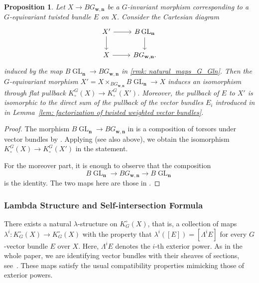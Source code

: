 \documentclass[12pt]{amsart}
\newcommand{\GL}{\operatorname{GL}}
\newcommand{\Kring}{K^{\circ}}
\newcommand{\Kgroup}{K_{\circ}}
\newtheorem{Prop}[theorem]{Proposition}
\theoremstyle{definition}
\begin{document}
\begin{Prop}\label{lemma: BT-toBGwn}
Let $X \to BG_{\mathbf{w},\mathbf{n}}$ be a $G$-invariant morphism corresponding to a $G$-equivariant twisted bundle $E$ on $X$. Consider the Cartesian diagram
\[
\begin{tikzcd}
X' \arrow[r] \arrow[d] & B \GL_{\mathbf{n}} \arrow[d] \\
X \arrow[r] & B G_{\mathbf{w},\mathbf{n}}.
\end{tikzcd}
\]
induced by the map $ B \GL_{\mathbf{n}} \longrightarrow BG_{\mathbf{w},\mathbf{n}}$ in \ref{rmk: natural_maps_G_Gln}. Then the $G$-equivariant morphism $X' = X \times_{BG_{\mathbf{w},\mathbf{n}}} B\GL_{\mathbf{n}} \longrightarrow X$ induces an isomorphism through flat pullback $\Kgroup^G(X) \rightarrow \Kgroup^G(X')$.
Moreover, the pullback of $E$ to $X'$ is isomorphic to the direct sum of the pullback of the vector bundles $E_i$ introduced in in Lemma~\ref{lem: factorization of twisted weighted vector bundles}.
\end{Prop}

\begin{proof}
    The morphism $ B \GL_{\mathbf{n}} \longrightarrow BG_{\mathbf{w},\mathbf{n}}$ in  is a composition of torsors under vector bundles by . Applying \cite[Theorem 4.1]{Thomason-equivariantKtheory} (see also  above), we obtain the isomorphism $\Kgroup^G(X) \rightarrow \Kgroup^G(X')$ in the statement.

     For the moreover part, it is enough to observe that the composition 
     $$  B \GL_{\mathbf{n}} \longrightarrow B G_{\mathbf{w},\mathbf{n}}\longrightarrow B \GL_{\mathbf{n}} $$ 
     is the identity. The two maps here are those in .
\end{proof}

\subsubsection{Lambda Structure and Self-intersection Formula}

There exists a natural $\lambda$-structure on $\Kring_G(X)$, that is, a collection of maps $\lambda^i:\Kring_G(X)\rightarrow\Kring_G(X)$ with the property that $\lambda^i([E])=[\Lambda^iE]$ for every $G$-vector bundle $E$ over $X$. Here, $\Lambda^iE$ denotes the $i$-th exterior power. As in the whole paper, we are identifying vector bundles with their sheaves of sections, see~. These maps satisfy the usual compatibility properties mimicking those of exterior powers.
\end{document}
